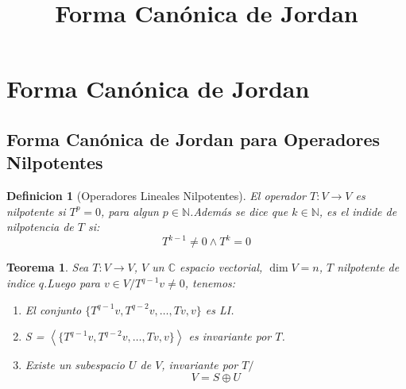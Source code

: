 \documentclass[10pt,a4paper]{article}
\title{Forma Canónica de Jordan}
\newtheorem{mydef}{Definicion}[section]
\newtheorem{mytheo}{Teorema}
\begin{document}
\maketitle

\section{Forma Canónica de Jordan}

\subsection{Forma Canónica de Jordan para Operadores Nilpotentes}
\begin{mydef}[Operadores Lineales Nilpotentes]
	El operador $T:V\rightarrow V$ es nilpotente si $T^{p} = 0$, para algun $p\in\mathbb{N}$.Además se dice que $k\in\mathbb{N}$, es el indide de nilpotencia de $T$ si:
$$T^{k-1}\neq 0 \wedge T^{k} = 0$$

\end{mydef}

\begin{mytheo}\label{theo_nilpotentes}
	Sea $T:V\rightarrow V$, $V$ un $\mathbb{C}$ espacio vectorial, $\dim V = n$, $T$ nilpotente de indice $q$.Luego para $v\in V/ T^{q-1}v\neq 0$, tenemos:
	\begin{enumerate}
		\item El conjunto $\{T^{q-1}v, T^{q-2}v,\ldots,Tv, v\}$ es LI.
		\item S = $\left<\{T^{q-1}v, T^{q-2}v,\ldots,Tv, v\}\right>$ es invariante por $T$.
		\item Existe un subespacio $U$ de $V$, invariante por $T/$
		$$V = S\oplus U$$
	\end{enumerate}
\end{mytheo}
\end{document}
